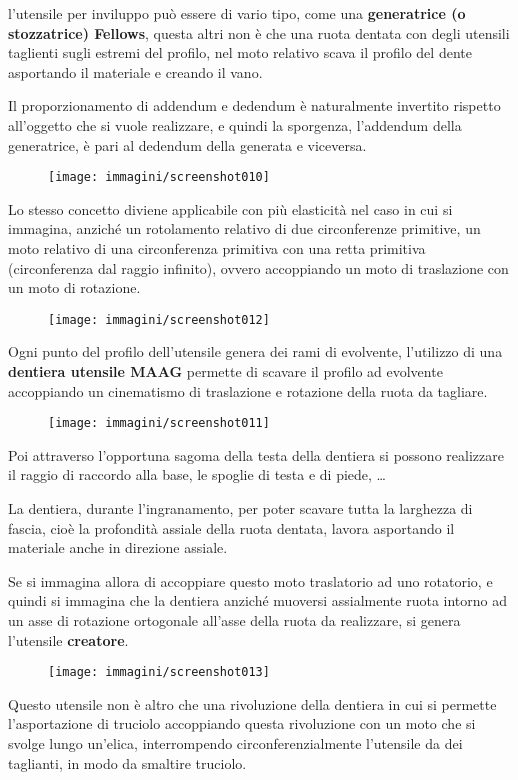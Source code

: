 \documentclass[a4paper, 15pt]{article}
\begin{document}
\begin{adjustwidth}{2in}{}
		l'utensile per inviluppo può essere di vario tipo, come una \textbf{generatrice (o stozzatrice) Fellows}, questa altri non è che una ruota dentata con degli utensili taglienti sugli estremi del profilo, nel moto relativo scava il profilo del dente asportando il materiale e creando il vano. 
		
		Il proporzionamento di addendum e dedendum è naturalmente invertito rispetto all'oggetto che si vuole realizzare, e quindi la sporgenza, l'addendum della generatrice, è pari al dedendum della generata e viceversa.
		\begin{figure}[H]
			\centering
			\texttt{[image: immagini/screenshot010]}
			\label{fig:screenshot010}
		\end{figure}
		Lo stesso concetto diviene applicabile con più elasticità nel caso in cui si immagina, anziché un rotolamento relativo di due circonferenze primitive, un moto relativo di una circonferenza primitiva con una retta primitiva (circonferenza dal raggio infinito), ovvero accoppiando un moto di traslazione con un moto di rotazione. 
		\begin{figure}[H]
			\centering
			\texttt{[image: immagini/screenshot012]}
			\label{fig:screenshot012}
		\end{figure}
		Ogni punto del profilo dell'utensile genera dei rami di evolvente, l'utilizzo di una \textbf{dentiera utensile MAAG} permette di scavare il profilo ad evolvente accoppiando un cinematismo di traslazione e rotazione della ruota da tagliare.
		\begin{figure}[H]
			\centering
			\texttt{[image: immagini/screenshot011]}
			\label{fig:screenshot011}
		\end{figure}		
		Poi attraverso l'opportuna sagoma della testa della dentiera si possono realizzare il raggio di raccordo alla base, le spoglie di testa e di piede, \dots \newline
		
		La dentiera, durante l'ingranamento, per poter scavare tutta la larghezza di fascia, cioè la profondità assiale della ruota dentata, lavora asportando il materiale anche in direzione assiale. 
		
		Se si immagina allora di accoppiare questo moto traslatorio ad uno rotatorio, e quindi si immagina che la dentiera anziché muoversi assialmente ruota intorno ad un asse di rotazione ortogonale all'asse della ruota da realizzare, si genera l'utensile \textbf{creatore}.  
		\begin{figure}[H]
			\centering
			\texttt{[image: immagini/screenshot013]}
			\label{fig:screenshot013}
		\end{figure}
		Questo utensile non è altro che una rivoluzione della dentiera in cui si permette l'asportazione di truciolo accoppiando questa rivoluzione con un moto che si svolge lungo un'elica, interrompendo circonferenzialmente l'utensile da dei taglianti, in modo da smaltire truciolo. \newline
		

\end{adjustwidth}
\end{document}
